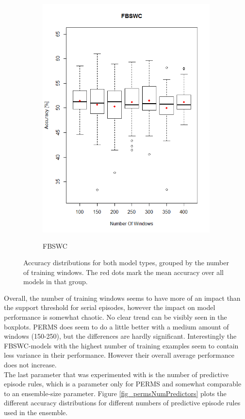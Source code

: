 \begin{figure}[h]
\begin{subfigure}{.5\textwidth}
  \includegraphics[width=\linewidth]{fbswcNumWindows}
  \label{fig_fbswcSupportSerial}
  \caption{FBSWC}
\end{subfigure}
\caption{Accuracy distributions for both model types, grouped by the number of training windows. The red dots mark the mean accuracy over all models in that group.}
\label{fig_numWindowsBoxplots}
\end{figure}

Overall, the number of training windows seems to have more of an impact than the support threshold for serial episodes, however the impact on model performance is somewhat chaotic. No clear trend can be visibly seen in the boxplots. PERMS does seem to do a little better with a medium amount of windows (150-250), but the differences are hardly significant. Interestingly the FBSWC-models with the highest number of training examples seem to contain less variance in their performance. However their overall average performance does not increase. \\
The last parameter that was experimented with is the number of predictive episode rules, which is a parameter only for PERMS and somewhat comparable to an ensemble-size parameter. Figure \ref{fig_permsNumPredictors} plots the different accuracy distributions for different numbers of predictive episode rules used in the ensemble.

